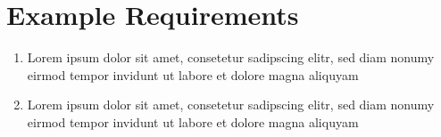 \chapter{Example Requirements}

\begin{enumerate}[leftmargin=\dimexpr\linewidth-13cm-\rightmargin\relax,label={\bfseries{TEMP-REQ-\arabic*}}]
	\item Lorem ipsum dolor sit amet, consetetur sadipscing elitr, sed diam nonumy eirmod tempor invidunt ut labore et dolore magna aliquyam
	\item Lorem ipsum dolor sit amet, consetetur sadipscing elitr, sed diam nonumy eirmod tempor invidunt ut labore et dolore magna aliquyam
\end{enumerate}
